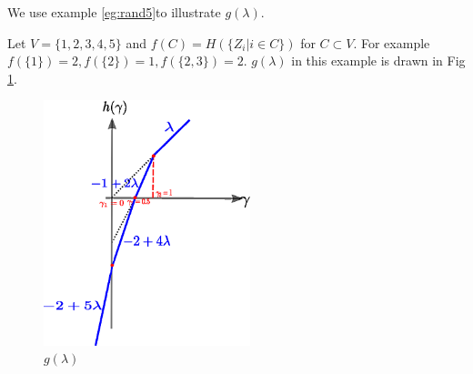 \documentclass{article}
\begin{document}
We use example \ref{eg:rand5}to illustrate $g(\lambda)$.

Let $V=\{1,2,3,4,5\}$ and $f(C) = H(\{Z_i |  i \in C \})$ for $C\subset V$.
For example $f(\{1\}) = 2, f(\{2\})=1, f(\{2,3\})=2$.
$g(\lambda)$ in this example is drawn in Fig \ref{fig:gLambda}.
\begin{figure}[!ht]
\includegraphics[width=6cm]{pic/dt2.eps}
\caption{$g(\lambda)$}\label{fig:gLambda}
\end{figure}
\end{document}
